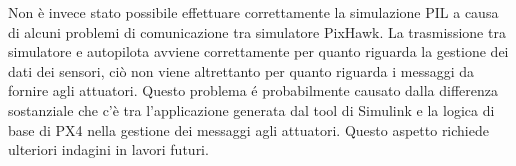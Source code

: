 \begin{commento}
Non è invece stato possibile effettuare correttamente la simulazione PIL a causa di alcuni problemi di comunicazione tra simulatore PixHawk. La trasmissione tra simulatore e autopilota avviene correttamente per quanto riguarda la gestione dei dati dei sensori, ciò non viene altrettanto per quanto riguarda i messaggi da fornire agli attuatori. Questo problema é probabilmente causato dalla differenza sostanziale che c'è tra l'applicazione generata dal tool di Simulink e la logica di base di PX4 nella gestione dei messaggi agli attuatori. Questo aspetto richiede ulteriori indagini in lavori futuri.

\end{commento}